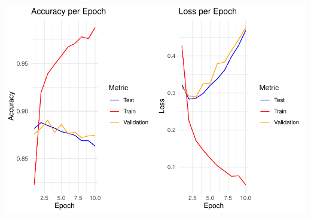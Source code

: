 \documentclass[
]{article}
\begin{document}
\includegraphics{A4_files/figure-latex/unnamed-chunk-25-1.pdf}
\end{document}
